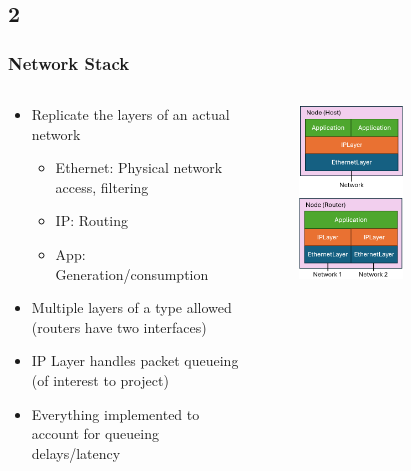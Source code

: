 \documentclass[compress]{beamer}
\begin{document}
    \subsection{2}
    \begin{frame}
        \frametitle{Network Stack}
        \begin{columns}
            \begin{column}{0.5\textwidth}
                \begin{itemize}
                    \item Replicate the layers of an actual network
                    \begin{itemize}
                        \item Ethernet: Physical network access, filtering
                        \item IP: Routing
                        \item App: Generation/consumption
                    \end{itemize}
                    \item Multiple layers of a type allowed (routers have two interfaces)
                    \item IP Layer handles packet queueing (of interest to project)
                    \item Everything implemented to account for queueing delays/latency
                \end{itemize}
            \end{column}

            \begin{column}{0.5\textwidth}
                \begin{figure}
                    \centering
                    \includegraphics[width=0.6\textwidth]{img/combo}
                \end{figure}
            \end{column}
        \end{columns}
    \end{frame}
\end{document}
